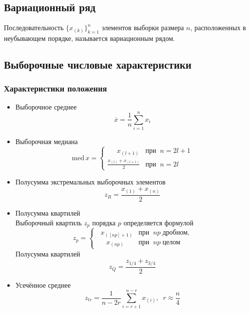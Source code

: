 \documentclass[a4paper,12pt]{article} %
\begin{document}
\subsection{Вариационный ряд}
Последовательность $\displaystyle\{x_{(k)}\}_{k=1}^n$ элементов выборки размера $n$, расположенных в неубывающем порядке, называется вариационным рядом.
\subsection{Выборочные числовые характеристики}
\subsubsection{Характеристики положения}
\begin{itemize}
    \item Выборочное среднее
    \begin{equation}\label{mean}
        \overline{x}=\frac{1}{n}\sum_{i=1}^n x_i
    \end{equation}
    \item Выборочная медиана
    \begin{equation}\label{med}
        \mathrm{med}\,x = \begin{cases}
        \displaystyle\;\;\;\;\;x_{(l+1)}&\text{при}\;\;n=2l+1\\
        \displaystyle\frac{x_{(l)}+x_{(l+1)}}{2}&\text{при}\;\;n=2l
        \end{cases}
    \end{equation}
    \item Полусумма экстремальных выборочных элементов
    \begin{equation}\label{exhfsum}
        z_R=\frac{x_{(1)}+x_{(n)}}{2}
    \end{equation}
    \item Полусумма квартилей\\
    Выборочный квартиль $z_p$ порядка $p$ определяется формулой
    \begin{equation}
        z_p = \begin{cases}\label{pqv}
        \displaystyle\;\;x_{([np]+1)}&\text{при}\;\;np\;\text{дробном,}\\
        \displaystyle\;\;\;\;\;x_{(np)}&\text{при}\;\;np\;\text{целом}
        \end{cases}
    \end{equation}
    Полусумма квартилей
    \begin{equation}\label{hfsum}
        z_Q=\frac{z_{1/4}+z_{3/4}}{2}
    \end{equation}
    \item Усечённое среднее
    \begin{equation}\label{trmean}
        z_{tr}=\frac{1}{n-2r}\sum_{i=r+1}^{n-r}x_{(i)},\;\;r\approx\frac{n}{4}
    \end{equation}
\end{itemize}
\end{document}
